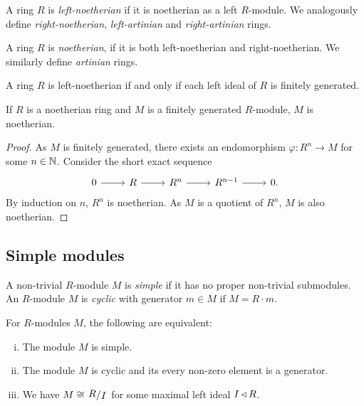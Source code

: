 
\begin{definicija}
A ring $R$ is \emph{left-noetherian} if it
is noetherian as a left $R$-module. We analogously define
\emph{right-noetherian}, \emph{left-artinian}
and \emph{right-artinian} rings.

A ring $R$ is \emph{noetherian}, if it is both left-noetherian and
right-noetherian. We similarly define \emph{artinian} rings.
\end{definicija}

\begin{opomba}
A ring $R$ is left-noetherian if and only if each left ideal of $R$
is finitely generated.
\end{opomba}

\begin{trditev}
If $R$ is a noetherian ring and $M$ is a finitely generated
$R$-module, $M$ is noetherian.
\end{trditev}

\begin{proof}
As $M$ is finitely generated, there exists an endomorphism
$\varphi \colon R^n \to M$ for some $n \in \mathbb{N}$. Consider the short
exact sequence
\[
\begin{tikzcd}
0 \arrow[r] & R \arrow[r] & R^n \arrow[r] & R^{n-1} \arrow[r] & 0.
\end{tikzcd}
\]
By induction on $n$, $R^n$ is noetherian. As $M$ is a quotient of
$R^n$, $M$ is also noetherian.
\end{proof}

\newpage

\subsection{Simple modules}

\begin{definicija}
A non-trivial $R$-module $M$ is \emph{simple}
if it has no proper non-trivial submodules. An $R$-module $M$ is
\emph{cyclic} with generator $m \in M$ if
$M = R \cdot m$.
\end{definicija}

\begin{trditev}
For $R$-modules $M$, the following are equivalent:

\begin{enumerate}[i)]
\item The module $M$ is simple.
\item The module $M$ is cyclic and its every non-zero element is a
generator.
\item We have $M \cong \kvoc{R}{I}$ for some maximal left ideal
$I \triangleleft R$.
\end{enumerate}
\end{trditev}

